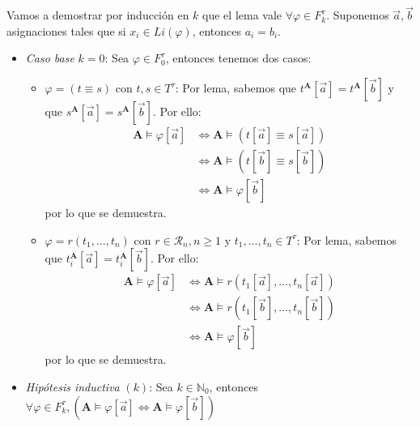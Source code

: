 \documentclass{article}
\begin{document}
\vspace{0.35cm}
Vamos a demostrar por inducción en $k$ que el lema vale $\forall\varphi\in F_k^\tau$. Suponemos $\vec{a},\vec{b}$ asignaciones tales que si $x_i\in Li(\varphi)$, entonces $a_i=b_i$.
\begin{itemize}
  \item \textit{Caso base} $k=0$: Sea $\varphi\in F^\tau_0$, entonces tenemos dos casos:
        \begin{itemize}
          \item $\varphi=(t\equiv s)$ con $t,s\in T^\tau$: Por lema, sabemos que $t^\mathbf{A}[\vec{a}]=t^\mathbf{A}[\vec{b}]$ y que $s^\mathbf{A}[\vec{a}]=s^\mathbf{A}[\vec{b}]$. Por ello:
                \begin{equation*}
                  \begin{aligned}
                    \mathbf{A}\vDash\varphi[\vec{a}] & \iff \mathbf{A}\vDash(t[\vec{a}]\equiv s[\vec{a}]) \\
                                                     & \iff \mathbf{A}\vDash(t[\vec{b}]\equiv s[\vec{b}]) \\
                                                     & \iff \mathbf{A}\vDash\varphi[\vec{b}]
                  \end{aligned}
                \end{equation*}
                por lo que se demuestra.
          \item $\varphi=r(t_1,\dots,t_n)$ con $r\in\mathcal{R}_n,n\geq 1$ y $t_1,\dots,t_n\in T^\tau$: Por lema, sabemos que $t_i^\mathbf{A}[\vec{a}]=t_i^\mathbf{A}[\vec{b}]$. Por ello:
                \begin{equation*}
                  \begin{aligned}
                    \mathbf{A}\vDash\varphi[\vec{a}] & \iff\mathbf{A}\vDash r(t_1[\vec{a}],\dots,t_n[\vec{a}]) \\
                                                     & \iff\mathbf{A}\vDash r(t_1[\vec{b}],\dots,t_n[\vec{b}]) \\
                                                     & \iff\mathbf{A}\vDash \varphi[\vec{b}]
                  \end{aligned}
                \end{equation*}
                por lo que se demuestra.
        \end{itemize}
  \item \textit{Hipótesis inductiva} $(k)$: Sea $k\in\mathbb{N}_0$, entonces $\forall\varphi\in F^\tau_k,(\mathbf{A}\vDash\varphi[\vec{a}]\iff\mathbf{A}\vDash\varphi[\vec{b}])$

\end{itemize}
\end{document}
